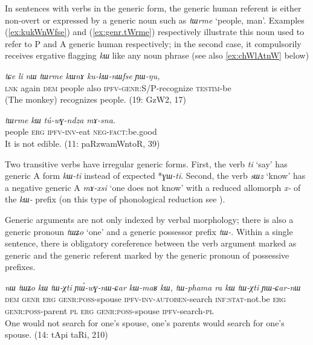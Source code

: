 \documentclass[oneside,a4paper,11pt]{article}
\newcommand{\ipa}[1]{\textit{\phon\mbox{#1}}} %
\newcommand{\refb}[1]{(\ref{#1})}
\begin{document}
In sentences with verbs in the generic form, the generic human referent is either non-overt or expressed by a generic noun such as \ipa{tɯrme} `people, man'. Examples \refb{ex:kukWnWfse} and \refb{ex:genr.tWrme} respectively illustrate this noun used to  refer to P and A generic human respectively; in the second case, it compulsorily receives  ergative flagging \ipa{kɯ} like any noun phrase (see also \ref{ex:chWlAtnW} below)

\begin{exe}
\ex \label{ex:kukWnWfse}
\gll
\ipa{tɕe}  	\ipa{li}  	\ipa{nɯ}  	\ipa{tɯrme}  	\ipa{kɯnɤ}  	\ipa{ku-kɯ-nɯfse}  	\ipa{ɲɯ-ŋu,}\\
\textsc{lnk} again \textsc{dem} people also \textsc{ipfv-genr:S/P}-recognize \textsc{testim}-be\\
\glt  (The monkey) recognizes people. (19: GzW2, 17)
\end{exe}

\begin{exe}
\ex  \label{ex:genr.tWrme}
\gll
\ipa{tɯrme} 	\ipa{kɯ} 	\ipa{tú-wɣ-ndza} 	\ipa{mɤ-sna.} \\
people \textsc{erg} \textsc{ipfv-inv}-eat \textsc{neg-fact}:be.good \\
\glt It is not edible. (11: paRzwamWntoR, 39)
\end{exe}

Two transitive verbs have irregular generic forms. First, the verb \ipa{ti} `say' has generic A form \ipa{kɯ-ti} instead of expected *\ipa{ɣɯ-ti}. Second, the verb \ipa{sɯz} `know' has a negative generic A \ipa{mɤ-xsi} `one does not know' with a reduced allomorph \ipa{x-} of the \ipa{kɯ-} prefix (on this type of phonological reduction see \citealt{jacques14antipassive}).

Generic arguments are not only indexed by verbal morphology; there is also a generic pronoun \ipa{tɯʑo} `one' and a generic possessor prefix \ipa{tɯ-}. Within a single sentence, there is obligatory coreference between the verb argument marked as generic and the generic referent marked by the generic pronoun of possessive prefixes.

\begin{exe}
\ex \label{ex:YWwGnWCar}
\gll
\ipa{nɯ} 	\ipa{tɯʑo} 	\ipa{kɯ} 	\ipa{tɯ-χti} 	\ipa{ɲɯ́-wɣ-nɯ-ɕar} 	\ipa{kɯ-maʁ} 	\ipa{kɯ,} 	\ipa{tɯ-phama} 	\ipa{ra} 	\ipa{kɯ} 	\ipa{tɯ-χti} 	\ipa{ɲɯ-ɕar-nɯ} 	\\
\textsc{dem} \textsc{genr} \textsc{erg} \textsc{genr:poss}-spouse \textsc{ipfv-inv-autoben}-search \textsc{inf:stat}-not.be \textsc{erg} \textsc{genr:poss}-parent \textsc{pl} \textsc{erg} \textsc{genr:poss}-spouse \textsc{ipfv}-search-\textsc{pl} \\
\glt One would not search for one's spouse, one's parents would search for one's spouse. (14: tApi taRi, 210)
\end{exe}
\end{document}
